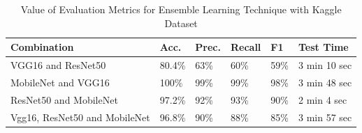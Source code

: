 \begin{table}[h]
\centering
\caption{Value of Evaluation Metrics for Ensemble Learning Technique with Kaggle Dataset}
\captionsetup[table]{skip=10pt}


{
\begin{tabular}{llllll}
\hline
Combination & Acc.   & Prec.  & Recall & F1 & Test Time   \\ \hline
VGG16 and ResNet50        & 80.4\%  & 63\% & 60\%  & 59\% & 3 min 10 sec\\
MobileNet and VGG16         & 100\% & 99\% & 99\%  & 98\% & 3 min 48 sec\\
ResNet50 and MobileNet     & 97.2\% & 92\% & 93\% & 90\% & 2 min 4 sec\\
Vgg16, ResNet50 and MobileNet    & 96.8\% & 90\% & 88\% & 85\% & 3 min 57 sec\\
 \hline
\end{tabular}
}
\label{table:ensemble-kaggle}
\end{table}